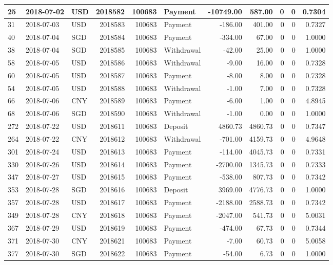\documentclass[]{article}
\begin{document}
\begin{table}[H]
\begin{tabular}{l|l|l|r|r|l|r|r|r|r|r}
25 & 2018-07-02 & USD & 2018582 & 100683 & Payment & -10749.00 & 587.00 & 0 & 0 & 0.7304\\
\hline
31 & 2018-07-03 & USD & 2018583 & 100683 & Payment & -186.00 & 401.00 & 0 & 0 & 0.7327\\
\hline
40 & 2018-07-04 & SGD & 2018584 & 100683 & Payment & -334.00 & 67.00 & 0 & 0 & 1.0000\\
\hline
38 & 2018-07-04 & SGD & 2018585 & 100683 & Withdrawal & -42.00 & 25.00 & 0 & 0 & 1.0000\\
\hline
58 & 2018-07-05 & USD & 2018586 & 100683 & Withdrawal & -9.00 & 16.00 & 0 & 0 & 0.7328\\
\hline
60 & 2018-07-05 & USD & 2018587 & 100683 & Payment & -8.00 & 8.00 & 0 & 0 & 0.7328\\
\hline
54 & 2018-07-05 & USD & 2018588 & 100683 & Withdrawal & -1.00 & 7.00 & 0 & 0 & 0.7328\\
\hline
66 & 2018-07-06 & CNY & 2018589 & 100683 & Payment & -6.00 & 1.00 & 0 & 0 & 4.8945\\
\hline
68 & 2018-07-06 & SGD & 2018590 & 100683 & Withdrawal & -1.00 & 0.00 & 0 & 0 & 1.0000\\
\hline
272 & 2018-07-22 & USD & 2018611 & 100683 & Deposit & 4860.73 & 4860.73 & 0 & 0 & 0.7347\\
\hline
264 & 2018-07-22 & CNY & 2018612 & 100683 & Withdrawal & -701.00 & 4159.73 & 0 & 0 & 4.9648\\
\hline
301 & 2018-07-24 & USD & 2018613 & 100683 & Payment & -114.00 & 4045.73 & 0 & 0 & 0.7331\\
\hline
330 & 2018-07-26 & USD & 2018614 & 100683 & Payment & -2700.00 & 1345.73 & 0 & 0 & 0.7333\\
\hline
347 & 2018-07-27 & USD & 2018615 & 100683 & Payment & -538.00 & 807.73 & 0 & 0 & 0.7342\\
\hline
353 & 2018-07-28 & SGD & 2018616 & 100683 & Deposit & 3969.00 & 4776.73 & 0 & 0 & 1.0000\\
\hline
357 & 2018-07-28 & USD & 2018617 & 100683 & Payment & -2188.00 & 2588.73 & 0 & 0 & 0.7342\\
\hline
349 & 2018-07-28 & CNY & 2018618 & 100683 & Payment & -2047.00 & 541.73 & 0 & 0 & 5.0031\\
\hline
367 & 2018-07-29 & USD & 2018619 & 100683 & Payment & -474.00 & 67.73 & 0 & 0 & 0.7344\\
\hline
371 & 2018-07-30 & CNY & 2018621 & 100683 & Payment & -7.00 & 60.73 & 0 & 0 & 5.0058\\
\hline
377 & 2018-07-30 & SGD & 2018622 & 100683 & Payment & -54.00 & 6.73 & 0 & 0 & 1.0000\\

\end{tabular}
\end{table}
\end{document}
